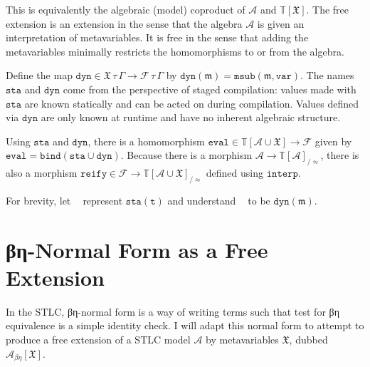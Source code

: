 \documentclass[11pt,a4paper]{article}
\newcommand*\Litt[1]{\texttt{#1}}
\newcommand*\term[1]{\ensuremath{\mathbb{T}{[{#1}]}}}
\newcommand*\sta[1]{\mathop{\overline{#1}}}
\newcommand*\dyn[1]{\mathop{\underline{#1}}}
\begin{document}
This is equivalently the algebraic (model) coproduct of \(\mathcal{A}\) and \(\term{\mathfrak{X}}\).
The free extension is an extension in the sense that the algebra \(\mathcal{A}\) is given
an interpretation of metavariables. It is free in the sense that adding the
metavariables minimally restricts the homomorphisms to or from the algebra.

Define the map \(\mathtt{dyn} \in {{\mathfrak{X}\,\tau\,\Gamma}\to{\mathcal{F}\,\tau\,\Gamma}}\) by \(\mathtt{dyn}(\mathfrak{m}) =
\mathtt{msub}(\mathfrak{m},\mathtt{var})\). The names \(\mathtt{sta}\) and \(\mathtt{dyn}\)
come from the perspective of staged compilation: values made with
\(\mathtt{sta}\) are known statically and can be acted on during compilation.
Values defined via \(\mathtt{dyn}\) are only known at runtime and have no
inherent algebraic structure.

Using \(\mathtt{sta}\) and \(\mathtt{dyn}\), there is a homomorphism
\(\mathtt{eval} \in {\term{\mathcal{A} \cup \mathfrak{X}}\to\mathcal{F}}\) given by \(\mathtt{eval} =
{\mathtt{bind}(\mathtt{sta}\cup\mathtt{dyn})}\). Because there is a morphism
\(\mathcal{A}\to{\term{\mathcal{A}}_{/\approx}}\)\footnotemark{}, there is also a morphism
\(\mathtt{reify} \in {\mathcal{F}\to{\term{\mathcal{A} \cup \mathfrak{X}}_{/\approx}}}\) defined using \(\mathtt{interp}\).



For brevity, let \(\sta{\Litt{t}}\) represent \(\mathtt{sta}(\Litt{t})\) and
understand \(\dyn{\mathfrak{m}}\) to be \(\mathtt{dyn}(\mathfrak{m})\).

\section{βη-Normal Form as a Free Extension}

In the STLC, βη-normal form is a way of writing terms such that test for βη
equivalence is a simple identity check. I will adapt this normal form to attempt
to produce a free extension of a STLC model \(\mathcal{A}\) by metavariables \(\mathfrak{X}\),
dubbed \(\mathcal{A}_{\beta\eta}[\mathfrak{X}]\).
\end{document}
